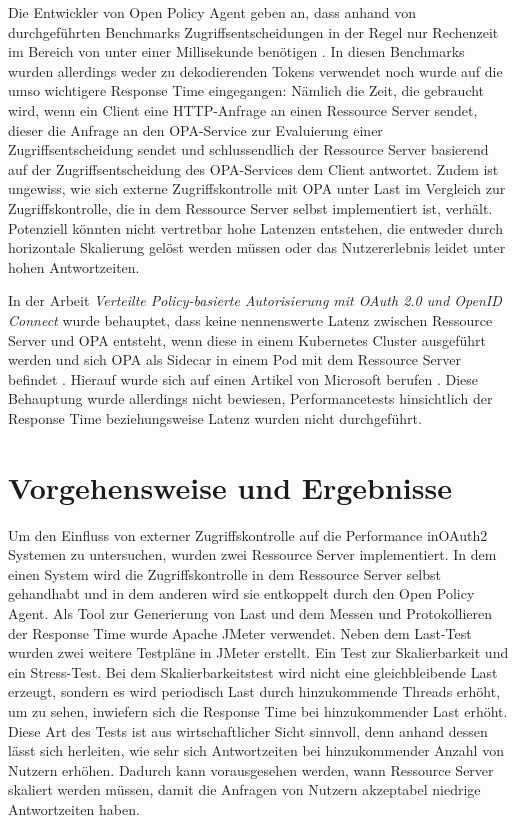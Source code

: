 Die Entwickler von Open Policy Agent geben an, dass anhand von durchgeführten Benchmarks Zugriffsentscheidungen in der Regel nur Rechenzeit im Bereich von unter einer Millisekunde benötigen \citep{opaperformance:2021:07}. In diesen Benchmarks wurden allerdings weder zu dekodierenden Tokens verwendet noch wurde auf die umso wichtigere Response Time eingegangen: Nämlich die Zeit, die gebraucht wird, wenn ein Client eine HTTP-Anfrage an einen Ressource Server sendet, dieser die Anfrage an den OPA-Service zur Evaluierung einer Zugriffsentscheidung sendet und schlussendlich der Ressource Server basierend auf der Zugriffsentscheidung des OPA-Services dem Client antwortet. Zudem ist ungewiss, wie sich externe Zugriffskontrolle mit OPA unter Last im Vergleich zur Zugriffskontrolle, die in dem Ressource Server selbst implementiert ist, verhält. Potenziell könnten nicht vertretbar hohe Latenzen entstehen, die entweder durch horizontale Skalierung gelöst werden müssen oder das Nutzererlebnis leidet unter hohen Antwortzeiten.\smallskip

In der Arbeit \emph{Verteilte Policy-basierte Autorisierung mit OAuth 2.0 und OpenID Connect} wurde behauptet, dass keine nennenswerte Latenz zwischen Ressource Server und OPA entsteht, wenn diese in einem Kubernetes Cluster ausgeführt werden und sich OPA als Sidecar in einem Pod mit dem Ressource Server befindet \citep{steinleitner:2020}. Hierauf wurde sich auf einen Artikel von Microsoft berufen \citep{sidecar:2017}. Diese Behauptung wurde allerdings nicht bewiesen, Performancetests hinsichtlich der Response Time beziehungsweise Latenz wurden nicht durchgeführt.

%
%
\section{Vorgehensweise und Ergebnisse}
\label{sec:intro:goal}
Um den Einfluss von externer Zugriffskontrolle auf die Performance in\linebreak OAuth2 Systemen zu untersuchen, wurden zwei Ressource Server implementiert. In dem einen System wird die Zugriffskontrolle in dem Ressource Server selbst gehandhabt und in dem anderen wird sie entkoppelt durch den Open Policy Agent. 
Als Tool zur Generierung von Last und dem Messen und Protokollieren der Response Time wurde Apache JMeter verwendet. Neben dem Last-Test wurden zwei weitere Testpläne in JMeter erstellt. Ein Test zur Skalierbarkeit und ein Stress-Test. Bei dem Skalierbarkeitstest wird nicht eine gleichbleibende Last erzeugt, sondern es wird periodisch Last durch hinzukommende Threads erhöht, um zu sehen, inwiefern sich die Response Time bei hinzukommender Last erhöht. Diese Art des Tests ist aus wirtschaftlicher Sicht sinnvoll, denn anhand dessen lässt sich herleiten, wie sehr sich Antwortzeiten bei hinzukommender Anzahl von Nutzern erhöhen. Dadurch kann vorausgesehen werden, wann Ressource Server skaliert werden müssen, damit die Anfragen von Nutzern akzeptabel niedrige Antwortzeiten haben.\smallskip

